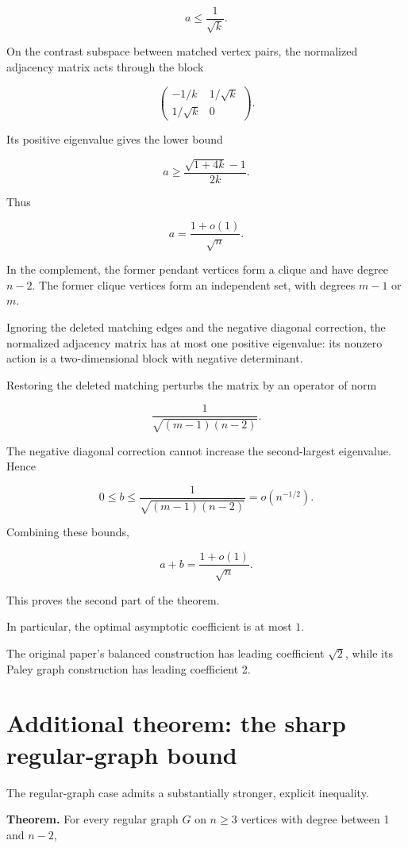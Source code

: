\documentclass[11pt]{article}
\begin{document}
\[
a\leq\frac1{\sqrt k}.
\]

On the contrast subspace between matched vertex pairs, the normalized adjacency matrix acts through the block

\[
\begin{pmatrix}
-1/k & 1/\sqrt k\\
1/\sqrt k & 0
\end{pmatrix}.
\]

Its positive eigenvalue gives the lower bound

\[
a\geq\frac{\sqrt{1+4k}-1}{2k}.
\]

Thus

\[
a=\frac{1+o(1)}{\sqrt n}.
\]

In the complement, the former pendant vertices form a clique and have degree \(n-2\). The former clique vertices form an independent set, with degrees \(m-1\) or \(m\).

Ignoring the deleted matching edges and the negative diagonal correction, the normalized adjacency matrix has at most one positive eigenvalue: its nonzero action is a two-dimensional block with negative determinant.

Restoring the deleted matching perturbs the matrix by an operator of norm

\[
\frac1{\sqrt{(m-1)(n-2)}}.
\]

The negative diagonal correction cannot increase the second-largest eigenvalue. Hence

\[
0\leq b\leq
\frac1{\sqrt{(m-1)(n-2)}}
=o(n^{-1/2}).
\]

Combining these bounds,

\[
\boxed{
a+b=\frac{1+o(1)}{\sqrt n}.
}
\]

This proves the second part of the theorem.

In particular, the optimal asymptotic coefficient is at most $1$.

The original paper's balanced construction has leading coefficient \(\sqrt2\), while its Paley graph construction has leading coefficient 2.

\section{Additional theorem: the sharp regular-graph bound}

The regular-graph case admits a substantially stronger, explicit inequality.

\textbf{Theorem.} For every regular graph \(G\) on \(n\geq3\) vertices with degree between 1 and \(n-2\),
\end{document}
